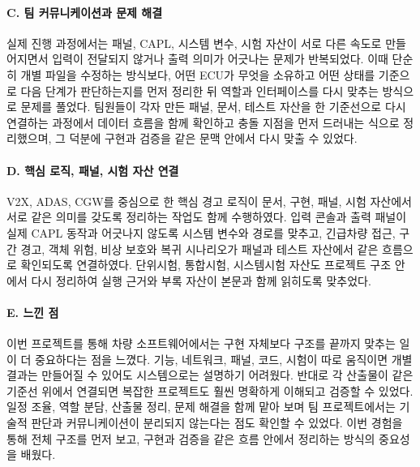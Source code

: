 \documentclass[11pt,a4paper]{article}
\begin{document}
\paragraph{C. 팀 커뮤니케이션과 문제 해결}
실제 진행 과정에서는 패널, CAPL, 시스템 변수, 시험 자산이 서로 다른 속도로 만들어지면서 입력이 전달되지 않거나 출력 의미가 어긋나는 문제가 반복되었다. 이때 단순히 개별 파일을 수정하는 방식보다, 어떤 ECU가 무엇을 소유하고 어떤 상태를 기준으로 다음 단계가 판단하는지를 먼저 정리한 뒤 역할과 인터페이스를 다시 맞추는 방식으로 문제를 풀었다. 팀원들이 각자 만든 패널, 문서, 테스트 자산을 한 기준선으로 다시 연결하는 과정에서 데이터 흐름을 함께 확인하고 충돌 지점을 먼저 드러내는 식으로 정리했으며, 그 덕분에 구현과 검증을 같은 문맥 안에서 다시 맞출 수 있었다.

\paragraph{D. 핵심 로직, 패널, 시험 자산 연결}
V2X, ADAS, CGW를 중심으로 한 핵심 경고 로직이 문서, 구현, 패널, 시험 자산에서 서로 같은 의미를 갖도록 정리하는 작업도 함께 수행하였다. 입력 콘솔과 출력 패널이 실제 CAPL 동작과 어긋나지 않도록 시스템 변수와 경로를 맞추고, 긴급차량 접근, 구간 경고, 객체 위험, 비상 보호와 복귀 시나리오가 패널과 테스트 자산에서 같은 흐름으로 확인되도록 연결하였다. 단위시험, 통합시험, 시스템시험 자산도 프로젝트 구조 안에서 다시 정리하여 실행 근거와 부록 자산이 본문과 함께 읽히도록 맞추었다.

\paragraph{E. 느낀 점}
이번 프로젝트를 통해 차량 소프트웨어에서는 구현 자체보다 구조를 끝까지 맞추는 일이 더 중요하다는 점을 느꼈다. 기능, 네트워크, 패널, 코드, 시험이 따로 움직이면 개별 결과는 만들어질 수 있어도 시스템으로는 설명하기 어려웠다. 반대로 각 산출물이 같은 기준선 위에서 연결되면 복잡한 프로젝트도 훨씬 명확하게 이해되고 검증할 수 있었다. 일정 조율, 역할 분담, 산출물 정리, 문제 해결을 함께 맡아 보며 팀 프로젝트에서는 기술적 판단과 커뮤니케이션이 분리되지 않는다는 점도 확인할 수 있었다. 이번 경험을 통해 전체 구조를 먼저 보고, 구현과 검증을 같은 흐름 안에서 정리하는 방식의 중요성을 배웠다.
\end{document}
